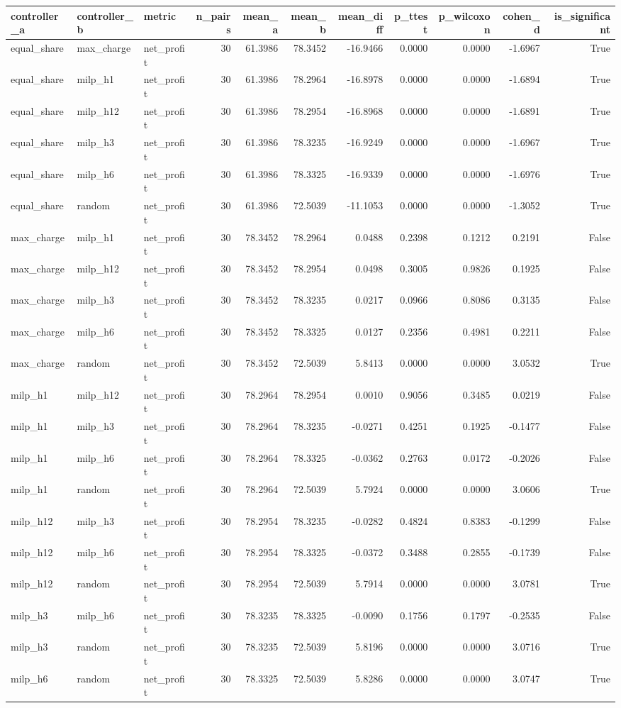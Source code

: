 \begin{tabular}{lllrrrrrrrr}
\toprule
controller_a & controller_b & metric & n_pairs & mean_a & mean_b & mean_diff & p_ttest & p_wilcoxon & cohen_d & is_significant \\
\midrule
equal_share & max_charge & net_profit & 30 & 61.3986 & 78.3452 & -16.9466 & 0.0000 & 0.0000 & -1.6967 & True \\
equal_share & milp_h1 & net_profit & 30 & 61.3986 & 78.2964 & -16.8978 & 0.0000 & 0.0000 & -1.6894 & True \\
equal_share & milp_h12 & net_profit & 30 & 61.3986 & 78.2954 & -16.8968 & 0.0000 & 0.0000 & -1.6891 & True \\
equal_share & milp_h3 & net_profit & 30 & 61.3986 & 78.3235 & -16.9249 & 0.0000 & 0.0000 & -1.6967 & True \\
equal_share & milp_h6 & net_profit & 30 & 61.3986 & 78.3325 & -16.9339 & 0.0000 & 0.0000 & -1.6976 & True \\
equal_share & random & net_profit & 30 & 61.3986 & 72.5039 & -11.1053 & 0.0000 & 0.0000 & -1.3052 & True \\
max_charge & milp_h1 & net_profit & 30 & 78.3452 & 78.2964 & 0.0488 & 0.2398 & 0.1212 & 0.2191 & False \\
max_charge & milp_h12 & net_profit & 30 & 78.3452 & 78.2954 & 0.0498 & 0.3005 & 0.9826 & 0.1925 & False \\
max_charge & milp_h3 & net_profit & 30 & 78.3452 & 78.3235 & 0.0217 & 0.0966 & 0.8086 & 0.3135 & False \\
max_charge & milp_h6 & net_profit & 30 & 78.3452 & 78.3325 & 0.0127 & 0.2356 & 0.4981 & 0.2211 & False \\
max_charge & random & net_profit & 30 & 78.3452 & 72.5039 & 5.8413 & 0.0000 & 0.0000 & 3.0532 & True \\
milp_h1 & milp_h12 & net_profit & 30 & 78.2964 & 78.2954 & 0.0010 & 0.9056 & 0.3485 & 0.0219 & False \\
milp_h1 & milp_h3 & net_profit & 30 & 78.2964 & 78.3235 & -0.0271 & 0.4251 & 0.1925 & -0.1477 & False \\
milp_h1 & milp_h6 & net_profit & 30 & 78.2964 & 78.3325 & -0.0362 & 0.2763 & 0.0172 & -0.2026 & False \\
milp_h1 & random & net_profit & 30 & 78.2964 & 72.5039 & 5.7924 & 0.0000 & 0.0000 & 3.0606 & True \\
milp_h12 & milp_h3 & net_profit & 30 & 78.2954 & 78.3235 & -0.0282 & 0.4824 & 0.8383 & -0.1299 & False \\
milp_h12 & milp_h6 & net_profit & 30 & 78.2954 & 78.3325 & -0.0372 & 0.3488 & 0.2855 & -0.1739 & False \\
milp_h12 & random & net_profit & 30 & 78.2954 & 72.5039 & 5.7914 & 0.0000 & 0.0000 & 3.0781 & True \\
milp_h3 & milp_h6 & net_profit & 30 & 78.3235 & 78.3325 & -0.0090 & 0.1756 & 0.1797 & -0.2535 & False \\
milp_h3 & random & net_profit & 30 & 78.3235 & 72.5039 & 5.8196 & 0.0000 & 0.0000 & 3.0716 & True \\
milp_h6 & random & net_profit & 30 & 78.3325 & 72.5039 & 5.8286 & 0.0000 & 0.0000 & 3.0747 & True \\
\bottomrule
\end{tabular}
